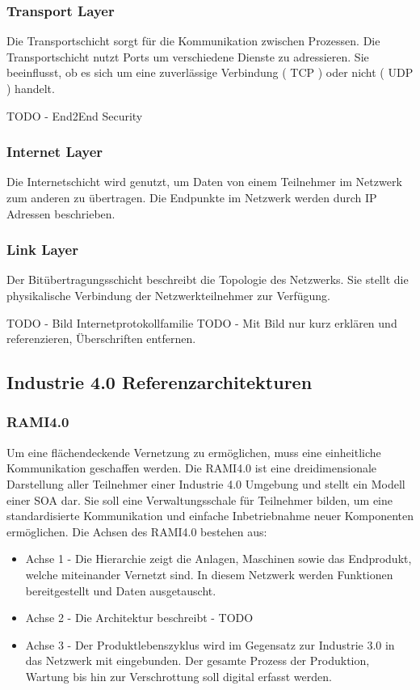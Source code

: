 \subsubsection{Transport Layer}
Die Transportschicht sorgt für die Kommunikation zwischen Prozessen. Die Transportschicht nutzt Ports um verschiedene Dienste zu adressieren. Sie beeinflusst, ob es sich um eine zuverlässige Verbindung ( TCP ) oder nicht ( UDP ) handelt.

TODO - End2End Security

\subsubsection{Internet Layer}
Die Internetschicht wird genutzt, um Daten von einem Teilnehmer im Netzwerk zum anderen zu übertragen. Die Endpunkte im Netzwerk werden durch IP Adressen beschrieben.

\subsubsection{Link Layer}
Der Bitübertragungsschicht beschreibt die Topologie des Netzwerks. Sie stellt die physikalische Verbindung der Netzwerkteilnehmer zur Verfügung.

TODO - Bild Internetprotokollfamilie
TODO - Mit Bild nur kurz erklären und referenzieren, Überschriften entfernen.

\subsection{Industrie 4.0 Referenzarchitekturen}
\subsubsection{\ac{RAMI4.0}}
Um eine flächendeckende Vernetzung zu ermöglichen, muss eine einheitliche Kommunikation geschaffen werden. Die \ac{RAMI4.0} ist eine dreidimensionale Darstellung aller Teilnehmer einer Industrie 4.0 Umgebung und stellt ein Modell einer \ac{SOA} dar. Sie soll eine Verwaltungsschale für Teilnehmer bilden, um eine standardisierte Kommunikation und einfache Inbetriebnahme neuer Komponenten ermöglichen. \cite{rami2016} Die Achsen des \ac{RAMI4.0} bestehen aus:

\begin{itemize}
  \item Achse 1 - Die Hierarchie zeigt die Anlagen, Maschinen sowie das Endprodukt, welche miteinander Vernetzt sind. In diesem Netzwerk werden Funktionen bereitgestellt und Daten ausgetauscht.
  \item Achse 2 - Die Architektur beschreibt - TODO
  \item Achse 3 - Der Produktlebenszyklus wird im Gegensatz zur Industrie 3.0 in das Netzwerk mit eingebunden. Der gesamte Prozess der Produktion, Wartung bis hin zur Verschrottung soll digital erfasst werden.
\end{itemize}

